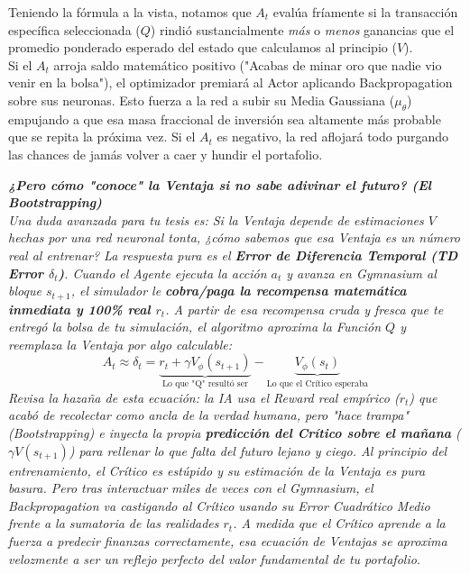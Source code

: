 \documentclass[11pt]{article}
\begin{document}
Teniendo la fórmula a la vista, notamos que $A_t$ evalúa fríamente si la transacción específica seleccionada ($Q$) rindió sustancialmente \textit{más} o \textit{menos} ganancias que el promedio ponderado esperado del estado que calculamos al principio ($V$). \\
Si el $A_t$ arroja saldo matemático positivo ("Acabas de minar oro que nadie vio venir en la bolsa"), el optimizador premiará al Actor aplicando Backpropagation sobre sus neuronas. Esto fuerza a la red a subir su Media Gaussiana ($\mu_\theta$) empujando a que esa masa fraccional de inversión sea altamente más probable que se repita la próxima vez. Si el $A_t$ es negativo, la red aflojará todo purgando las chances de jamás volver a caer y hundir el portafolio.

\vspace{1mm}
\textit{\textbf{¿Pero cómo "conoce" la Ventaja si no sabe adivinar el futuro? (El Bootstrapping)}}\\
\textit{Una duda avanzada para tu tesis es: Si la Ventaja depende de estimaciones $V$ hechas por una red neuronal tonta, ¿cómo sabemos que esa Ventaja es un número real al entrenar? La respuesta pura es el \textbf{Error de Diferencia Temporal (TD Error $\delta_t$)}. Cuando el Agente ejecuta la acción $a_t$ y avanza en Gymnasium al bloque $s_{t+1}$, el simulador le \textbf{cobra/paga la recompensa matemática inmediata y 100\% real $r_t$}. A partir de esa recompensa cruda y fresca que te entregó la bolsa de tu simulación, el algoritmo aproxima la Función $Q$ y reemplaza la Ventaja por algo calculable:}
\begin{equation}
    A_t \approx \delta_t = \underbrace{r_t + \gamma V_\phi(s_{t+1})}_{\text{Lo que "Q" resultó ser}} - \underbrace{V_\phi(s_t)}_{\text{Lo que el Crítico esperaba}}
\end{equation}
\textit{Revisa la hazaña de esta ecuación: la IA usa el Reward real empírico ($r_t$) que acabó de recolectar como ancla de la verdad humana, pero "hace trampa" (Bootstrapping) e inyecta la propia \textbf{predicción del Crítico sobre el mañana} ($\gamma V(s_{t+1})$) para rellenar lo que falta del futuro lejano y ciego. Al principio del entrenamiento, el Crítico es estúpido y su estimación de la Ventaja es pura basura. Pero tras interactuar miles de veces con el Gymnasium, el Backpropagation va castigando al Crítico usando su Error Cuadrático Medio frente a la sumatoria de las realidades $r_t$. A medida que el Crítico aprende a la fuerza a predecir finanzas correctamente, esa ecuación de Ventajas  se aproxima velozmente a ser un reflejo perfecto del valor fundamental de tu portafolio.}
\end{document}
